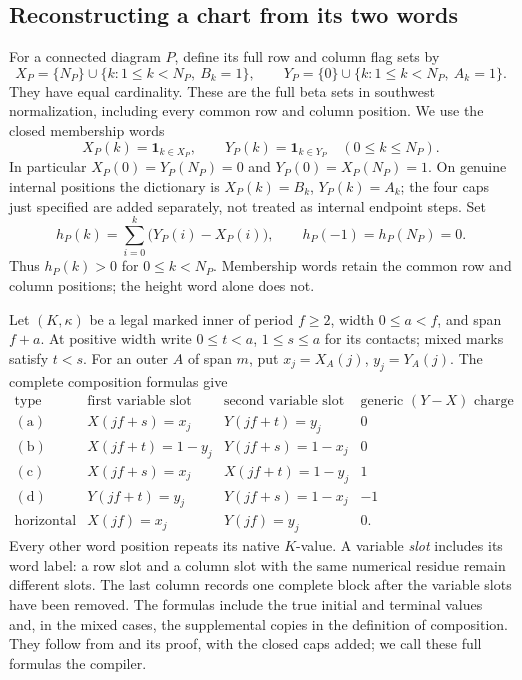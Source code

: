 \documentclass[11pt,a4paper]{amsart}
\numberwithin{equation}{section}
\theoremstyle{plain}
\theoremstyle{definition}
\begin{document}
\subsection{Reconstructing a chart from its two words}

For a connected diagram \(P\), define its full row and column flag sets by
\[
 X_P=\{N_P\}\cup\{k:1\le k<N_P,\ B_k=1\},\qquad
 Y_P=\{0\}\cup\{k:1\le k<N_P,\ A_k=1\}.
\]
They have equal cardinality.  These are the full beta sets in southwest normalization, including every common row and column position.
We use the closed membership words
\[
 X_P(k)=\mathbf1_{k\in X_P},\qquad Y_P(k)=\mathbf1_{k\in Y_P}
 \quad(0\le k\le N_P).
\]
In particular \(X_P(0)=Y_P(N_P)=0\) and
\(Y_P(0)=X_P(N_P)=1\).
On genuine internal positions the dictionary is \(X_P(k)=B_k\), \(Y_P(k)=A_k\); the four caps just specified are added separately, not treated as internal endpoint steps.  Set
\[
 h_P(k)=\sum_{i=0}^{k}\bigl(Y_P(i)-X_P(i)\bigr),
 \qquad h_P(-1)=h_P(N_P)=0.
\]
Thus \(h_P(k)>0\) for \(0\le k<N_P\).  Membership words retain the
common row and column positions; the height word alone does not.

Let \((K,\kappa)\) be a legal marked inner of period \(f\ge2\), width
\(0\le a<f\), and span \(f+a\).  At positive width write
\(0\le t<a\), \(1\le s\le a\) for its contacts; mixed marks satisfy
\(t<s\).  For an outer \(A\) of span \(m\), put
\(x_j=X_A(j)\), \(y_j=Y_A(j)\).  The complete composition formulas give
\begin{equation}\label{ge:eq:ports}
\begin{array}{c|c|c|r}
\text{type}&\text{first variable slot}&\text{second variable slot}
 &\text{generic }(Y-X)\text{ charge}\\ \hline
\mathrm{(a)}&X(jf+s)=x_j&Y(jf+t)=y_j&0\\
\mathrm{(b)}&X(jf+t)=1-y_j&Y(jf+s)=1-x_j&0\\
\mathrm{(c)}&X(jf+s)=x_j&X(jf+t)=1-y_j&1\\
\mathrm{(d)}&Y(jf+t)=y_j&Y(jf+s)=1-x_j&-1\\
\text{horizontal EMPTY}&X(jf)=x_j&Y(jf)=y_j&0.
\end{array}
\end{equation}
Every other word position repeats its native \(K\)-value.  A variable
\emph{slot} includes its word label: a row slot and a column slot with the
same numerical residue remain different slots.  The last column records
one complete block after the variable slots have been removed.  The
formulas include the true initial and terminal values and, in the mixed
cases, the supplemental copies in the definition of composition.
They follow from  and its proof, with the
closed caps added; we call these full formulas the compiler.
\end{document}
